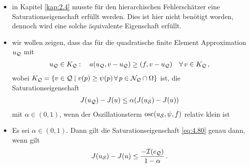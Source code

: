 

\begin{itemize}
\item in Kapitel \ref{kap:2.4} musste für den hierarchischen Fehlerschätzer eine Saturationseigenschaft erfüllt werden. Dies ist hier nicht benötigt worden, dennoch wird eine solche äquivalente Eigenschaft erfüllt.

\item wir wollen zeigen, dass das für die quadratische finite Element Approximation $u_{\mathcal Q}$ mit
\begin{align}\label{eq:4.79}
	u_{\mathcal Q} \in K_{\mathcal Q} : \quad a(u_{\mathcal Q}, v-u_{\mathcal Q}) \ge (f,v-u_{\mathcal Q}) \quad \forall \, v \in K_{\mathcal Q} \, ,
\end{align}
wobei $K_{\mathcal Q} = \{v \in \mathcal Q \mid v(p)\ge \psi(p) \, \forall \, p \in \mathcal N_{\mathcal Q} \cap \Omega\}$ ist, die Saturationseigenschaft
\begin{align}\label{eq:4.80}
	J(u_{\mathcal Q})-J(u) \le \alpha (J(u_{\mathcal S})-J(u))
\end{align}
mit $\alpha \in (0,1)$, wenn der Oszillationsterm $\operatorname{osc} (u_{\mathcal S},\psi,f)$ relativ klein ist

\item
\begin{lemma}\label{lem:4.26}
Es sei $\alpha \in (0,1)$. Dann gilt die Saturationseigenschaft \eqref{eq:4.80} genau dann, wenn gilt
\begin{align}\label{eq:4.81}
	J(u_{\mathcal S}) - J(u) \le \frac{-\mathcal I (e_{\mathcal Q})}{1-\alpha} \, .
\end{align}
\end{lemma}


\end{itemize}
